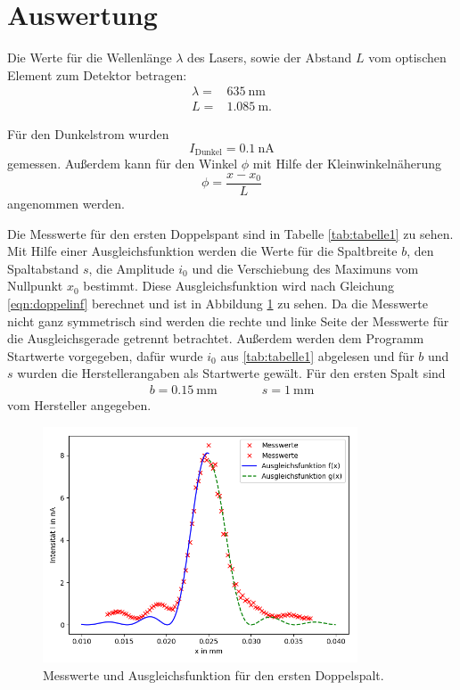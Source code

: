 \section{Auswertung}
\label{sec:Auswertung}
Die Werte für die Wellenlänge $\lambda$ des Lasers, sowie der Abstand $L$ vom optischen Element zum
Detektor betragen:
\begin{align*}
  \lambda=&\SI{635}{\nm}\\
  L=&\SI{1,085}{\m}.
\end{align*}

Für den Dunkelstrom wurden
\begin{equation*}
   I_{\text{Dunkel}}=\SI{0.1}{\nA}
\end{equation*}
gemessen. Außerdem kann für den Winkel $\phi$ mit Hilfe der Kleinwinkelnäherung
\begin{equation}
  \phi= \frac{x-x_{0}}{L}
\end{equation}
angenommen werden.

Die Messwerte für den ersten Doppelspant sind in Tabelle \ref{tab:tabelle1} zu sehen.
Mit Hilfe einer Ausgleichsfunktion werden die Werte für die Spaltbreite $b$, den
Spaltabstand $s$, die Amplitude $i_0$ und die Verschiebung des Maximuns vom Nullpunkt $x_{0}$ bestimmt.
Diese Ausgleichsfunktion wird nach Gleichung \ref{eqn:doppelinf} berechnet und ist in
Abbildung \ref{fig:plot1} zu sehen. Da die Messwerte nicht ganz symmetrisch sind werden
die rechte und linke Seite der Messwerte für die Ausgleichsgerade getrennt betrachtet.
Außerdem werden dem Programm Startwerte vorgegeben, dafür wurde $i_0$ aus \ref{tab:tabelle1}
abgelesen und für $b$ und $s$ wurden die Herstellerangaben als Startwerte gewält.
Für den ersten Spalt sind
\begin{align*}
  b=\SI{0,15}{\mm} &\;\;\;\;\;\;\;\;\;\; s=\SI{1}{\mm}
\end{align*}
vom Hersteller angegeben.


\begin{figure}
  \centering
  \includegraphics[height=7cm]{Figure_1.png}
  \caption{Messwerte und Ausgleichsfunktion für den ersten Doppelspalt.}
  \label{fig:plot1}
\end{figure}


